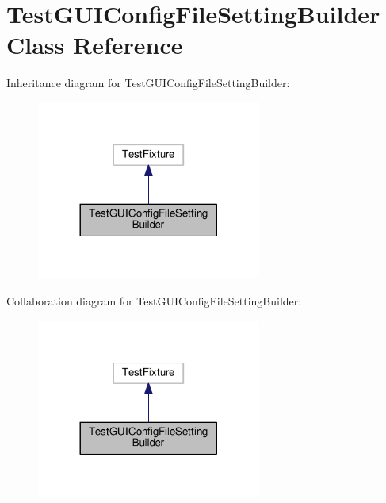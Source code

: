 \hypertarget{class_test_g_u_i_config_file_setting_builder}{}\section{Test\+G\+U\+I\+Config\+File\+Setting\+Builder Class Reference}
\label{class_test_g_u_i_config_file_setting_builder}


Inheritance diagram for Test\+G\+U\+I\+Config\+File\+Setting\+Builder\+:
\nopagebreak
\begin{figure}[H]
\begin{center}
\leavevmode
\includegraphics[width=209pt]{class_test_g_u_i_config_file_setting_builder__inherit__graph}
\end{center}
\end{figure}


Collaboration diagram for Test\+G\+U\+I\+Config\+File\+Setting\+Builder\+:
\nopagebreak
\begin{figure}[H]
\begin{center}
\leavevmode
\includegraphics[width=209pt]{class_test_g_u_i_config_file_setting_builder__coll__graph}
\end{center}
\end{figure}
